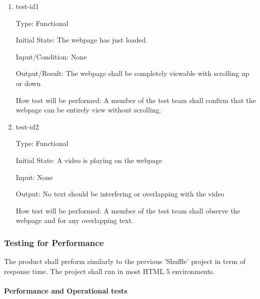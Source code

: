 \documentclass[12pt, titlepage]{article}
\begin{document}
\begin{enumerate}

\item{test-id1\\}

Type: Functional
					
Initial State: The webpage has just loaded.
					
Input/Condition: None
					
Output/Result: The webpage shall be completely viewable with scrolling up or down
					
How test will be performed: \color{red}A member of the test team shall confirm that the webpage can be entirely view without scrolling. \color{black}
					
\item{test-id2\\}

Type: Functional
					
Initial State: A video is playing on the webpage
					
Input: None
					
Output: No text should be interfering or overlapping with the video
					
How test will be performed: \color{red}A member of the test team shall observe the webpage and for any overlapping text. \color{black}

\end{enumerate}

\subsubsection{Testing for Performance}

The product shall preform similarly to the previous 'Shuffle' project in term of response time.  The project shall run in most HTML 5 environments.

\paragraph{Performance and Operational tests}
\end{document}
